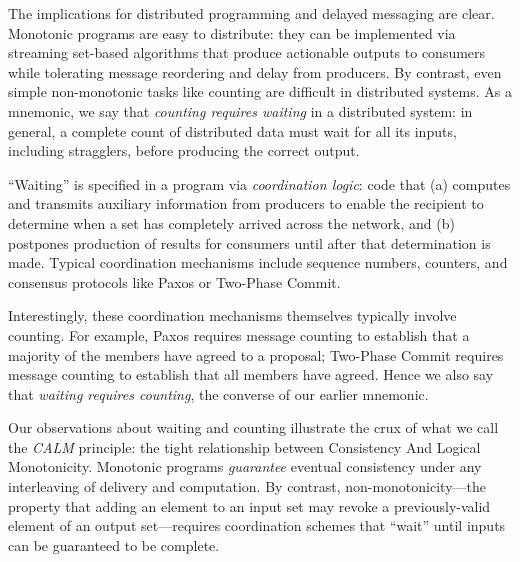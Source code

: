 The implications for distributed programming and delayed messaging are clear. Monotonic programs are easy to distribute: they can be implemented via streaming set-based algorithms that produce actionable outputs to consumers while tolerating message reordering and delay from producers.  By contrast, even simple non-monotonic tasks like counting are difficult in distributed systems.  As a mnemonic, we say that \emph{counting requires waiting} in a distributed system: in general, a complete count of distributed data must wait for all its inputs, including stragglers, before producing the correct output.

``Waiting'' is specified in a program via \emph{coordination logic}: code that (a) computes and transmits auxiliary information from producers to enable the recipient to determine when a set has completely arrived across the network, and (b) postpones production of results for consumers until after that determination is made.  Typical coordination mechanisms include sequence numbers, counters, and consensus protocols like Paxos or Two-Phase Commit.

Interestingly, these coordination mechanisms themselves typically involve counting.  For example, Paxos requires message counting to establish that a majority of the members have agreed to a proposal; Two-Phase Commit requires message counting to establish  that all members have agreed.  Hence we also say that \emph{waiting requires counting}, the converse of our earlier mnemonic.  

Our observations about waiting and counting illustrate the crux of what we call the \emph{CALM} principle: the tight relationship between Consistency And Logical Monotonicity.  Monotonic programs \emph{guarantee} eventual consistency under any interleaving of delivery and computation.  By contrast, non-monotonicity---the property that adding an element to an input set may revoke a previously-valid element of an output set---requires coordination schemes that ``wait'' until inputs can be guaranteed to be complete.  

